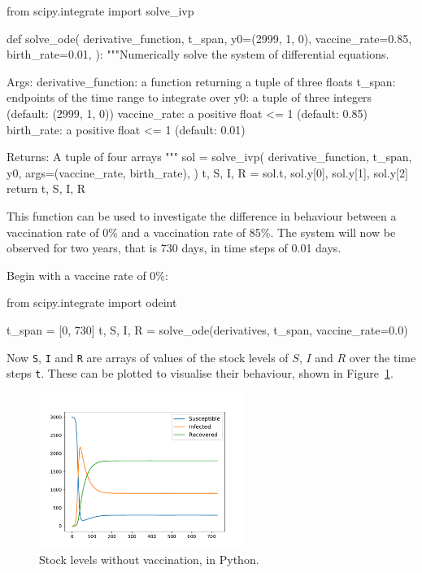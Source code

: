 \begin{pyin}
from scipy.integrate import solve_ivp


def solve_ode(
    derivative_function,
    t_span,
    y0=(2999, 1, 0),
    vaccine_rate=0.85,
    birth_rate=0.01,
):
    """Numerically solve the system of differential equations.

    Args:
        derivative_function: a function returning a tuple
                             of three floats
        t_span: endpoints of the time range to integrate over
        y0: a tuple of three integers (default: (2999, 1, 0))
        vaccine_rate: a positive float <= 1 (default: 0.85)
        birth_rate: a positive float <= 1 (default: 0.01)

    Returns:
        A tuple of four arrays
    """
    sol = solve_ivp(
        derivative_function,
        t_span,
        y0,
        args=(vaccine_rate, birth_rate),
    )
    t, S, I, R = sol.t, sol.y[0], sol.y[1], sol.y[2]
    return t, S, I, R
\end{pyin}

This function can be used to investigate the difference in behaviour between a
vaccination rate of 0\% and a vaccination rate of 85\%. The system will now be
observed for two years, that is 730 days, in time steps of 0.01 days.

Begin with a vaccine rate of 0\%:

\begin{pyin}
from scipy.integrate import odeint

t_span = [0, 730]
t, S, I, R = solve_ode(derivatives, t_span, vaccine_rate=0.0)
\end{pyin}

Now \texttt{S}, \texttt{I} and \texttt{R}
are arrays of values of the stock levels of $S$, $I$ and $R$ over the time
steps \texttt{t}.
These can be plotted to visualise their behaviour, shown in
Figure~\ref{fig:plot_no_vaccine}.

\begin{figure}
\begin{center}
\includegraphics[width=0.6\textwidth]{./assets/sd_vaccine_plots/plot_no_vaccine_python.pdf}
\end{center}
\caption{Stock levels without vaccination, in Python.}
\label{fig:plot_no_vaccine}
\end{figure}

